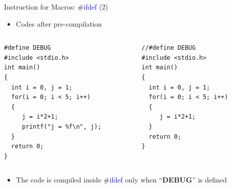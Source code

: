 \begin{frame}[fragile]{Instruction for Macros: \#\textcolor{blue}{ifdef} (2)}
\begin{itemize}
	\item {Codes after pre-compilation}
\end{itemize}
\vspace{-0.2in}
\begin{columns}
\begin{column}{0.52\linewidth}
\begin{lstlisting}[xleftmargin=0.02\linewidth, linewidth=0.9\linewidth]
#define DEBUG
#include <stdio.h>
int main()
{
  int i = 0, j = 1;
  for(i = 0; i < 5; i++)
  {
     j = i*2+1;
     printf("j = %f\n", j);
  }
  return 0;
}
\end{lstlisting}
\end{column}
\begin{column}{0.47\linewidth}
\begin{lstlisting}
//#define DEBUG
#include <stdio.h>
int main()
{
  int i = 0, j = 1;
  for(i = 0; i < 5; i++)
  {
     j = i*2+1;
  }
  return 0;
}
\end{lstlisting}
\end{column}
\end{columns}
\vspace{-0.2in}
\begin{itemize}
	\item {The code is compiled inside \#\textcolor{blue}{ifdef} only when ``\textbf{DEBUG}'' is defined}
\end{itemize}
\end{frame}